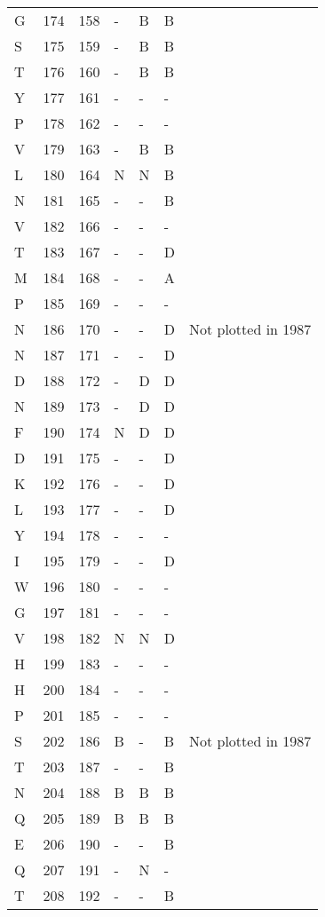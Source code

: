 \begin{longtable}{lllllll}
  G & 174 & 158 & - & B & B &  \\ 
  S & 175 & 159 & - & B & B &  \\ 
  T & 176 & 160 & - & B & B &  \\ 
  Y & 177 & 161 & - & - & - &  \\ 
  P & 178 & 162 & - & - & - &  \\ 
  V & 179 & 163 & - & B & B &  \\ 
  L & 180 & 164 & N & N & B &  \\ 
  N & 181 & 165 & - & - & B &  \\ 
  V & 182 & 166 & - & - & - &  \\ 
  T & 183 & 167 & - & - & D &  \\ 
  M & 184 & 168 & - & - & A &  \\ 
  P & 185 & 169 & - & - & - &  \\ 
  N & 186 & 170 & - & - & D & Not plotted in 1987 \\ 
  N & 187 & 171 & - & - & D &  \\ 
  D & 188 & 172 & - & D & D &  \\ 
  N & 189 & 173 & - & D & D &  \\ 
  F & 190 & 174 & N & D & D &  \\ 
  D & 191 & 175 & - & - & D &  \\ 
  K & 192 & 176 & - & - & D &  \\ 
  L & 193 & 177 & - & - & D &  \\ 
  Y & 194 & 178 & - & - & - &  \\ 
  I & 195 & 179 & - & - & D &  \\ 
  W & 196 & 180 & - & - & - &  \\ 
  G & 197 & 181 & - & - & - &  \\ 
  V & 198 & 182 & N & N & D &  \\ 
  H & 199 & 183 & - & - & - &  \\ 
  H & 200 & 184 & - & - & - &  \\ 
  P & 201 & 185 & - & - & - &  \\ 
  S & 202 & 186 & B & - & B & Not plotted in 1987 \\ 
  T & 203 & 187 & - & - & B &  \\ 
  N & 204 & 188 & B & B & B &  \\ 
  Q & 205 & 189 & B & B & B &  \\ 
  E & 206 & 190 & - & - & B &  \\ 
  Q & 207 & 191 & - & N & - &  \\ 
  T & 208 & 192 & - & - & B &  \\ 

\end{longtable}
